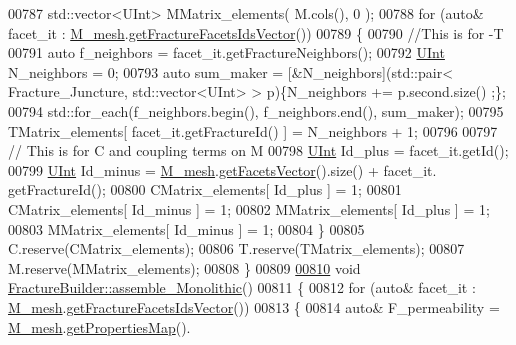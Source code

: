 \begin{DoxyCode}
00787         std::vector<UInt> MMatrix\_elements( M.cols(), 0 );
00788     \textcolor{keywordflow}{for} (\textcolor{keyword}{auto}& facet\_it : \hyperlink{classFVCode3D_1_1global__Operator_a027911d0f801f6f19a3006329ec30a7f}{M\_mesh}.\hyperlink{classFVCode3D_1_1Rigid__Mesh_aadbe6d9ad704122537903396d91238e0}{getFractureFacetsIdsVector}())
00789     \{   
00790                 \textcolor{comment}{//This is for -T}
00791                 \textcolor{keyword}{auto} f\_neighbors = facet\_it.getFractureNeighbors();
00792                 \hyperlink{namespaceFVCode3D_a4bf7e328c75d0fd504050d040ebe9eda}{UInt} N\_neighbors = 0;
00793         \textcolor{keyword}{auto} sum\_maker = [&N\_neighbors](std::pair< Fracture\_Juncture, std::vector<UInt> > p)\{N\_neighbors +=
       p.second.size() ;\};
00794         std::for\_each(f\_neighbors.begin(), f\_neighbors.end(), sum\_maker);
00795                 TMatrix\_elements[ facet\_it.getFractureId() ] = N\_neighbors + 1;
00796                 
00797                 \textcolor{comment}{// This is for C and coupling terms on M}
00798                 \hyperlink{namespaceFVCode3D_a4bf7e328c75d0fd504050d040ebe9eda}{UInt} Id\_plus   = facet\_it.getId();
00799                 \hyperlink{namespaceFVCode3D_a4bf7e328c75d0fd504050d040ebe9eda}{UInt} Id\_minus  = \hyperlink{classFVCode3D_1_1global__Operator_a027911d0f801f6f19a3006329ec30a7f}{M\_mesh}.\hyperlink{classFVCode3D_1_1Rigid__Mesh_a6d3cdd4ef8a5225599953179d5302636}{getFacetsVector}().size() + facet\_it.
      getFractureId();
00800                 CMatrix\_elements[ Id\_plus ]   = 1;
00801                 CMatrix\_elements[ Id\_minus ]  = 1;
00802                 MMatrix\_elements[ Id\_plus ]   = 1;
00803                 MMatrix\_elements[ Id\_minus ]  = 1;
00804         \}       
00805         C.reserve(CMatrix\_elements);
00806         T.reserve(TMatrix\_elements);
00807         M.reserve(MMatrix\_elements);
00808 \}
00809 
\hypertarget{global__operator_8cpp_source.tex_l00810}{}\hyperlink{classFVCode3D_1_1FractureBuilder_a8aa6db02f37b5fdd9d9a86b2ca6b1fcf}{00810} \textcolor{keywordtype}{void} \hyperlink{classFVCode3D_1_1FractureBuilder_a8aa6db02f37b5fdd9d9a86b2ca6b1fcf}{FractureBuilder::assemble\_Monolithic}()
00811 \{
00812     \textcolor{keywordflow}{for} (\textcolor{keyword}{auto}& facet\_it : \hyperlink{classFVCode3D_1_1global__Operator_a027911d0f801f6f19a3006329ec30a7f}{M\_mesh}.\hyperlink{classFVCode3D_1_1Rigid__Mesh_aadbe6d9ad704122537903396d91238e0}{getFractureFacetsIdsVector}())
00813     \{   
00814         \textcolor{keyword}{auto}& F\_permeability = \hyperlink{classFVCode3D_1_1global__Operator_a027911d0f801f6f19a3006329ec30a7f}{M\_mesh}.\hyperlink{classFVCode3D_1_1Rigid__Mesh_ab6e52fa6193e5db83fe7ccbb1c3737e8}{getPropertiesMap}().

\end{DoxyCode}
